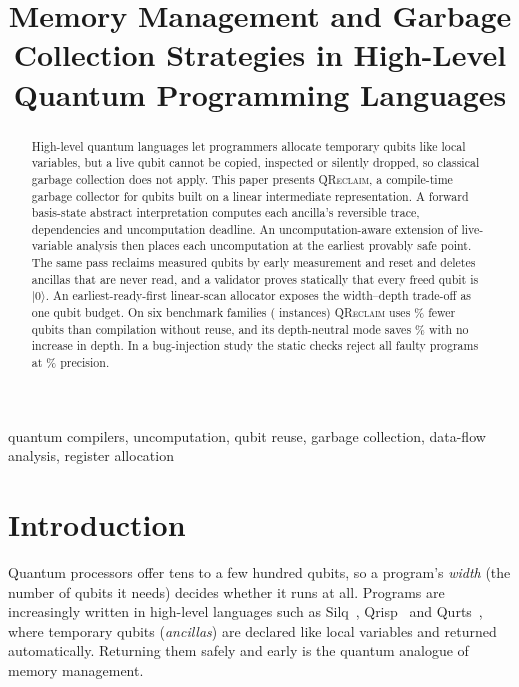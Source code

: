 \documentclass[conference,a4paper]{IEEEtran}
\newcommand{\QR}{\textup{\textsc{QReclaim}}}
\begin{document}
\title{Memory Management and Garbage Collection Strategies in High-Level Quantum Programming Languages}

\author{
}

\maketitle

\begin{abstract}
High-level quantum languages let programmers allocate temporary qubits like local variables, but a live qubit cannot be copied, inspected or silently dropped, so classical garbage collection does not apply. This paper presents \QR{}, a compile-time garbage collector for qubits built on a linear intermediate representation. A forward basis-state abstract interpretation computes each ancilla's reversible trace, dependencies and uncomputation deadline. An uncomputation-aware extension of live-variable analysis then places each uncomputation at the earliest provably safe point. The same pass reclaims measured qubits by early measurement and reset and deletes ancillas that are never read, and a validator proves statically that every freed qubit is $|0\rangle$. An earliest-ready-first linear-scan allocator exposes the width--depth trade-off as one qubit budget. On six benchmark families (\NInst{} instances) \QR{} uses \RedQRvsNR\% fewer qubits than compilation without reuse, and its depth-neutral mode saves \RedDNvsNR\% with no increase in depth. In a bug-injection study the static checks reject all \MutFaulty{} faulty programs at \MutPrecision\% precision.
\end{abstract}

\begin{IEEEkeywords}
quantum compilers, uncomputation, qubit reuse, garbage collection, data-flow analysis, register allocation
\end{IEEEkeywords}

\section{Introduction}
Quantum processors offer tens to a few hundred qubits, so a program's \emph{width} (the number of qubits it needs) decides whether it runs at all. Programs are increasingly written in high-level languages such as Silq~\cite{silq}, Qrisp~\cite{qrisp} and Qurts~\cite{qurts}, where temporary qubits (\emph{ancillas}) are declared like local variables and returned automatically. Returning them safely and early is the quantum analogue of memory management.
\end{document}
